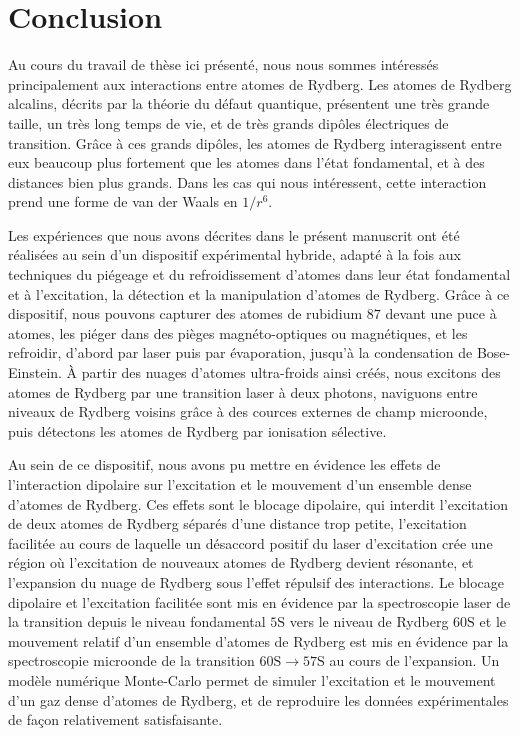 \chapter*{Conclusion}\label{chapter:concl}
 \mtcaddchapter
{}
 
\noindent Au cours du travail de thèse ici présenté, nous nous sommes intéressés principalement aux interactions entre atomes de Rydberg.
Les atomes de Rydberg alcalins, décrits par la théorie du défaut quantique, présentent une très grande taille, un très long temps de vie, et de très grands dipôles électriques de transition.
Grâce à ces grands dipôles, les atomes de Rydberg interagissent entre eux beaucoup plus fortement que les atomes dans l'état fondamental, et à des distances bien plus grands.
Dans les cas qui nous intéressent, cette interaction prend une forme de van der Waals en $1/r^6$.

Les expériences que nous avons décrites dans le présent manuscrit ont été réalisées au sein d'un dispositif expérimental hybride, adapté à la fois aux techniques du piégeage et du refroidissement d'atomes dans leur état fondamental et à l'excitation, la détection et la  manipulation d'atomes de Rydberg.
Grâce à ce dispositif, nous pouvons capturer des atomes de rubidium $87$ devant une puce à atomes, les piéger dans des pièges magnéto-optiques ou magnétiques, et les refroidir, d'abord par laser puis par évaporation, jusqu'à %
la condensation de Bose-Einstein.
\`A partir des nuages d'atomes ultra-froids ainsi créés, nous excitons des atomes de Rydberg par une transition laser à deux photons, naviguons entre niveaux de Rydberg voisins grâce à des cources externes de champ microonde, puis détectons les atomes de Rydberg par ionisation sélective.

Au sein de ce dispositif, nous avons pu mettre en évidence les effets de l'interaction dipolaire sur l'excitation et le mouvement d'un ensemble dense d'atomes de Rydberg.
Ces effets sont le blocage dipolaire, qui interdit l'excitation de deux atomes de Rydberg séparés d'une distance trop petite, l'excitation facilitée au cours de laquelle un désaccord positif du laser d'excitation crée une région où l'excitation de nouveaux atomes de Rydberg devient résonante, et l'expansion du nuage de Rydberg sous l'effet répulsif des interactions.
Le blocage dipolaire et l'excitation facilitée sont mis en évidence par la spectroscopie laser de la transition depuis le niveau fondamental $\mathrm{5S}$ vers le niveau de Rydberg $\mathrm{60S}$ et le mouvement relatif d'un ensemble d'atomes de Rydberg est mis en évidence par la spectroscopie microonde de la transition $\mathrm{60S \rightarrow 57S}$ au cours de l'expansion.
Un modèle numérique Monte-Carlo permet de simuler l'excitation et le mouvement d'un gaz dense d'atomes de Rydberg, et de reproduire les données expérimentales de façon relativement satisfaisante.

